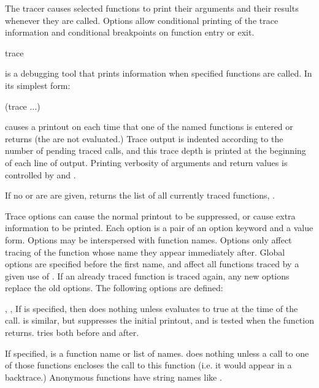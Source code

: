 The tracer causes selected functions to print their arguments and
their results whenever they are called.  Options allow conditional
printing of the trace information and conditional breakpoints on
function entry or exit.

\begin{defmac}{}{trace}{%
    }
  
   is a debugging tool that prints information when
  specified functions are called.  In its simplest form:
  \begin{example}
    (trace   ...)
  \end{example}
   causes a printout on  each time
  that one of the named functions is entered or returns (the
   are not evaluated.)  Trace output is indented according
  to the number of pending traced calls, and this trace depth is
  printed at the beginning of each line of output.  Printing verbosity
  of arguments and return values is controlled by
   and .
  
  If no  or  are are given, 
  returns the list of all currently traced functions,
  .
  
  Trace options can cause the normal printout to be suppressed, or
  cause extra information to be printed.  Each option is a pair of an
  option keyword and a value form.  Options may be interspersed with
  function names.  Options only affect tracing of the function whose
  name they appear immediately after.  Global options are specified
  before the first name, and affect all functions traced by a given
  use of .  If an already traced function is traced again,
  any new options replace the old options.  The following options are
  defined:
  \begin{Lentry}
  \item[\kwd{condition} \var{form}, \kwd{condition-after} \var{form},
    \kwd{condition-all} \var{form}] If  is specified,
    then  does nothing unless  evaluates to true
    at the time of the call.   is similar, but
    suppresses the initial printout, and is tested when the function
    returns.   tries both before and after.
    
  \item[\kwd{wherein} \var{names}] If specified,  is a
    function name or list of names.   does nothing unless
    a call to one of those functions encloses the call to this
    function (i.e. it would appear in a backtrace.)  Anonymous
    functions have string names like .
  

\end{Lentry}
\end{defmac}
